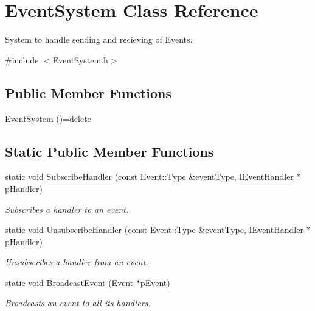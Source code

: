 \hypertarget{class_event_system}{}\section{Event\+System Class Reference}
\label{class_event_system}


System to handle sending and recieving of Events.  




{\ttfamily \#include $<$Event\+System.\+h$>$}

\subsection*{Public Member Functions}
\begin{DoxyCompactItemize}
\item 
\mbox{\hyperlink{class_event_system_a461a525365e056375c1e4177897688ed}{Event\+System}} ()=delete
\end{DoxyCompactItemize}
\subsection*{Static Public Member Functions}
\begin{DoxyCompactItemize}
\item 
static void \mbox{\hyperlink{class_event_system_a25048a2cae1066f84ce0e0c7aecf6314}{Subscribe\+Handler}} (const Event\+::\+Type \&event\+Type, \mbox{\hyperlink{class_i_event_handler}{I\+Event\+Handler}} $\ast$p\+Handler)
\begin{DoxyCompactList}\small\item\em Subscribes a handler to an event. \end{DoxyCompactList}\item 
static void \mbox{\hyperlink{class_event_system_ae8ebabb2d7e4604b3d5f666d9bcb1d32}{Unsubscribe\+Handler}} (const Event\+::\+Type \&event\+Type, \mbox{\hyperlink{class_i_event_handler}{I\+Event\+Handler}} $\ast$p\+Handler)
\begin{DoxyCompactList}\small\item\em Unsubscribes a handler from an event. \end{DoxyCompactList}\item 
static void \mbox{\hyperlink{class_event_system_ae7f287c5ee2c8001e19467ae8fda8a67}{Broadcast\+Event}} (\mbox{\hyperlink{struct_event}{Event}} $\ast$p\+Event)
\begin{DoxyCompactList}\small\item\em Broadcasts an event to all its handlers. \end{DoxyCompactList}\end{DoxyCompactItemize}


